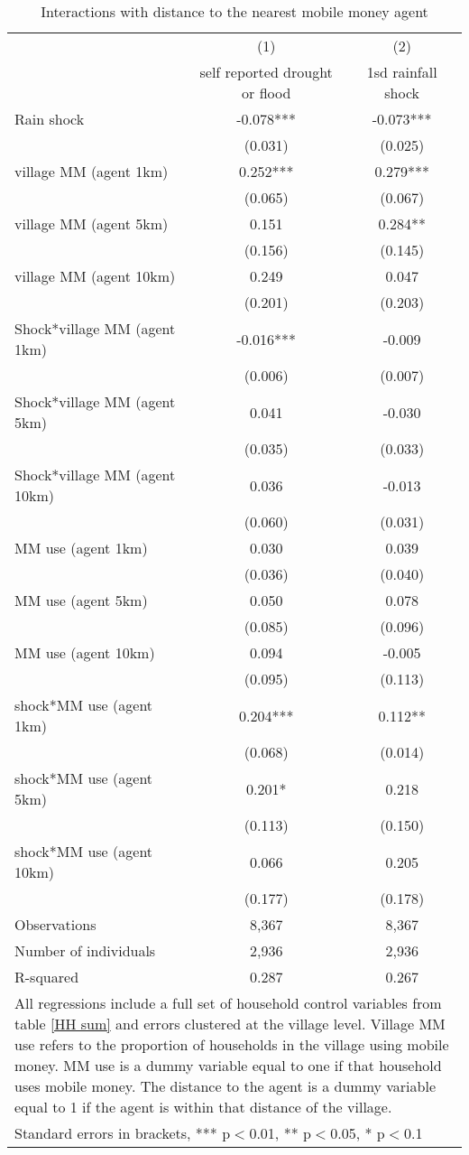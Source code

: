 \begin{table}
\centering \caption{Interactions with distance to the nearest mobile money agent} \label{distance}
\def\arraystretch{0.92}
\begin{tabular}{lcc} \hline
 & (1) & (2) \\
 & self reported drought or flood & 1sd rainfall shock \\ \hline
Rain shock & -0.078*** & -0.073*** \\
& (0.031) & (0.025) \\
village MM (agent 1km) & 0.252*** & 0.279*** \\
 & (0.065) & (0.067) \\
village MM (agent 5km) & 0.151 & 0.284**  \\
  & (0.156)  & (0.145) \\
village MM (agent 10km) & 0.249 & 0.047 \\
 & (0.201) & (0.203) \\
Shock*village MM (agent 1km)  & -0.016*** &  -0.009 \\
 & (0.006) &  (0.007)  \\
Shock*village MM (agent 5km) & 0.041 & -0.030 \\
 & (0.035) & (0.033)  \\
Shock*village MM (agent 10km)  & 0.036 & -0.013 \\
 & (0.060) &  (0.031) \\
MM use (agent 1km)  & 0.030 & 0.039 \\
 & (0.036) & (0.040) \\
MM use (agent 5km) & 0.050 &  0.078  \\
 & (0.085) &  (0.096)  \\
MM use (agent 10km)  & 0.094 & -0.005 \\
 & (0.095) & (0.113) \\
shock*MM use (agent 1km) & 0.204*** &  0.112**  \\
 & (0.068) &  (0.014) \\
shock*MM use (agent 5km) & 0.201* & 0.218 \\
 & (0.113) & (0.150) \\
shock*MM use (agent 10km) & 0.066 &  0.205   \\
 & (0.177) &  (0.178) \\
Observations & 8,367 & 8,367 \\
Number of individuals & 2,936 & 2,936 \\
R-squared & 0.287 & 0.267 \\
  \hline
\multicolumn{3}{p{13cm}}{All regressions include a full set of household control variables from table \ref{HH sum} and errors clustered at the village level. Village MM use refers to the proportion of households in the village using mobile money. MM use is a dummy variable equal to one if that household uses mobile money. The distance to the agent is a dummy variable equal to 1 if the agent is within that distance of the village.} \\
\multicolumn{3}{l}{Standard errors in brackets, *** p$<$0.01, ** p$<$0.05, * p$<$0.1} \\
\end{tabular}
\end{table}